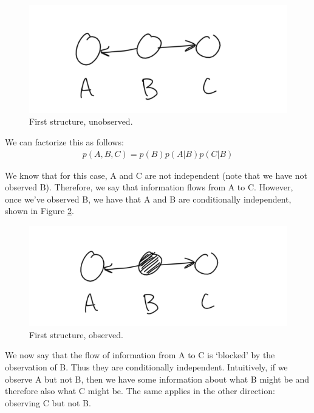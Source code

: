 \begin{figure}
	\centering
	\includegraphics[width=0.5\paperwidth]{../GraphicalModels/fig/first-case-unobserved.png}
	\caption{First structure, unobserved.}
	\label{fig:first-case-unobserved}
\end{figure}

We can factorize this as follows:
\begin{align*}
	p(A, B, C) = p(B) p(A | B) p(C | B)
\end{align*}

We know that for this case, A and C are not independent (note that we have not observed B). Therefore, we say that information flows from A to C. However, once we've observed B, we have that A and B are conditionally independent, shown in Figure \ref{fig:first-case-observed}.

\begin{figure}
	\centering
	\includegraphics[width=0.5\paperwidth]{../GraphicalModels/fig/first-case-observed.png}
	\caption{First structure, observed.}
	\label{fig:first-case-observed}
\end{figure}

We now say that the flow of information from A to C is `blocked' by the observation of B. Thus they are conditionally independent. Intuitively, if we observe A but not B, then we have some information about what B might be and therefore also what C might be. The same applies in the other direction: observing C but not B.

